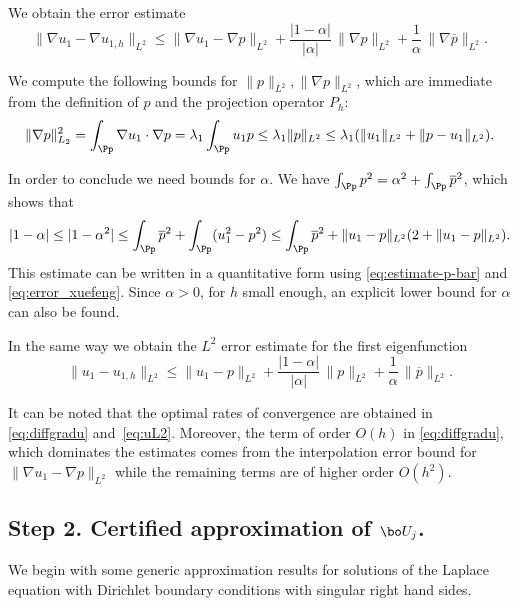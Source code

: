 We obtain the error estimate
\begin{equation}
\|\nabla u_1- \nabla u_{1,h}\|_{L^2} \le \|\nabla u_1-\nabla p\|_{L^2} + \frac{|1-\alpha|}{|\alpha |}\, \|\nabla p\|_{L^2} + \frac{1}{\alpha }\, \|\nabla \overline p \|_{L^2}.
\label{eq:diffgradu}
\end{equation}

We compute the following bounds for $\|p\|_{L^2}, \|\nabla p\|_{L^2}$, which are immediate from the definition of $p$ and the projection operator $P_h$:
\[
\| \nabla p\|_{L_2}^2 = \int_\Pp \nabla u_1 \cdot \nabla p = \lambda_1 \int_\Pp u_1p \leq \lambda_1 \|p\|_{L^2}\leq \lambda_1 (\|u_1\|_{L^2}+\|p-u_1\|_{L^2}).
\]

In order to conclude we need bounds for $\alpha$. We have $\int_\Pp p^2=\alpha^2 + \int_\Pp \overline p^2$, which shows that
\[
|1-\alpha| \leq |1-\alpha^2| \leq \int_\Pp \overline p^2 +\int_\Pp (u_1^2-p^2) \leq \int_\Pp \overline p^2 + \|u_1-p\|_{L^2}(2+\|u_1-p\|_{L^2}).
\]
This estimate can be written in a quantitative form using \eqref{eq:estimate-p-bar} and \eqref{eq:error_xuefeng}. Since $\alpha>0$, for $h$ small enough, an explicit lower bound for $\alpha$ can also be found.

In the same way we obtain the $L^2$ error estimate for the first eigenfunction
\begin{equation}
\|u_1-u_{1,h}\|_{L^2} \leq \|u_1-p\|_{L^2}+\frac{|1-\alpha|}{|\alpha|}\, \|p\|_{L^2}+\frac{1}{\alpha}\, \|\overline p\|_{L^2}.
\label{eq:uL2}
\end{equation}

It can be noted that the optimal rates of convergence are obtained in \eqref{eq:diffgradu} and~\eqref{eq:uL2}. Moreover, the term of order $O(h)$ in \eqref{eq:diffgradu}, which dominates the estimates comes from the interpolation error bound for $\|\nabla u_1-\nabla p\|_{L^2}$ while the remaining terms are of higher order $O(h^2)$.

\subsection{Step 2. Certified approximation of $\bo U_j$.}
\label{sec:estimates-U}
We begin with some generic approx\-imation results for solutions of the Laplace equation with Dirichlet boundary conditions with singular right hand sides.

